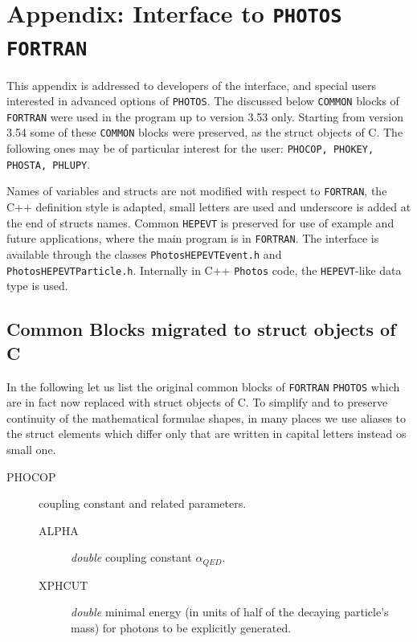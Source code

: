 \documentclass[]{Photos_interface_design}
\begin{document}
\newpage
\appendix

\section{Appendix: Interface to {\tt PHOTOS FORTRAN}}
\label{Interface to PHOTOS}


This appendix is addressed to developers of the interface,
and special users interested in advanced options of {\tt PHOTOS}.
The discussed below {\tt COMMON} blocks of {\tt FORTRAN} were used in the
program up  to version 3.53 only.
Starting from version 3.54 some of these {\tt COMMON}  blocks were preserved,
as the struct objects of C. The following ones may be of particular interest for the
user:
{\tt PHOCOP, PHOKEY, PHOSTA, PHLUPY}.

Names of variables and structs are not modified with respect to {\tt FORTRAN}, 
the  C++ definition style is adapted, small letters are used and underscore is added at the
end of structs names.
Common {\tt HEPEVT} is preserved for use of example and future applications,
 where the main program is in {\tt FORTRAN}.
The interface is available
through the classes {\tt PhotosHEPEVTEvent.h} and {\tt PhotosHEPEVTParticle.h}.
Internally in C++  {\tt Photos} code, the {\tt HEPEVT}-like  data type
is used.

\subsection{Common Blocks migrated to struct objects of C}

In the following let us list the original common blocks of {\tt FORTRAN} {\tt PHOTOS} which are in fact now replaced with struct objects of C. 
To simplify 
and to preserve continuity of  the mathematical formulae shapes,
in many places  we  use  aliases to the struct elements  
which differ only that are  written in capital letters instead os small one.



\begin{description}
\item[PHOCOP] coupling constant and related parameters.
    \begin{description}
	\item[ALPHA]  \textit{double} coupling constant $\alpha_{QED}$.
	\item[XPHCUT] \textit{double} minimal energy (in units of half of the decaying particle's mass) for photons to be explicitly generated.
    \end{description}
\end{description}
\end{document}
